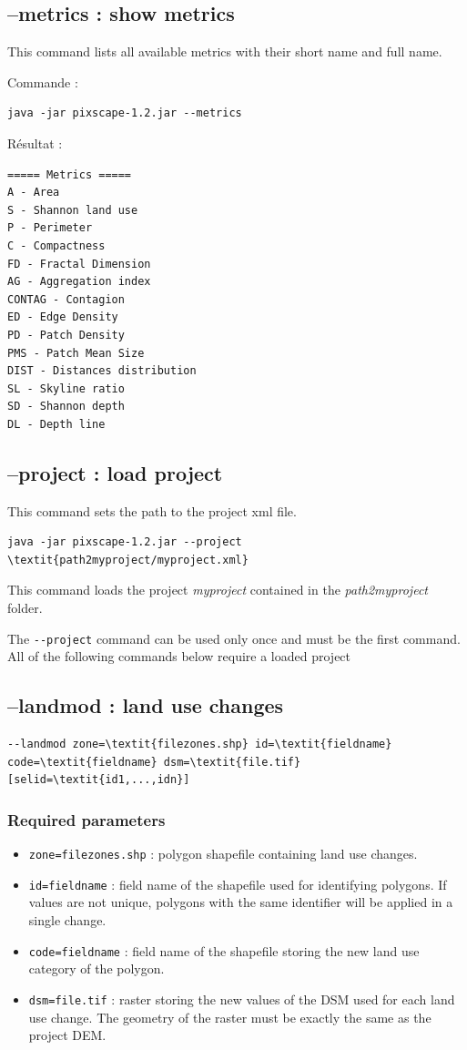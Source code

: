 \documentclass{report}
\begin{document}
\subsection{--metrics : show metrics}
This command lists all available metrics with their short name and full name.

Commande :
\begin{Verbatim}
java -jar pixscape-1.2.jar --metrics
\end{Verbatim}
Résultat :
\begin{Verbatim}
===== Metrics =====
A - Area
S - Shannon land use
P - Perimeter
C - Compactness
FD - Fractal Dimension
AG - Aggregation index
CONTAG - Contagion
ED - Edge Density
PD - Patch Density
PMS - Patch Mean Size
DIST - Distances distribution
SL - Skyline ratio
SD - Shannon depth
DL - Depth line
\end{Verbatim}

\subsection{--project : load project}
This command sets the path to the project xml file.
\begin{Verbatim}[commandchars=\\\{\}]
java -jar pixscape-1.2.jar --project \textit{path2myproject/myproject.xml}
\end{Verbatim}
This command loads the project \textit{myproject} contained in the \textit{path2myproject} folder.

The \verb|--project| command can be used only once and must be the first command.  All of the following commands below require a loaded project

\subsection{--landmod : land use changes}

\begin{Verbatim}[commandchars=\\\{\}]
--landmod zone=\textit{filezones.shp} id=\textit{fieldname} code=\textit{fieldname} dsm=\textit{file.tif} [selid=\textit{id1,...,idn}]
\end{Verbatim}

\subsubsection{Required parameters}
\begin{itemize}
	\item \verb|zone=filezones.shp| : polygon shapefile containing land use changes.
	\item \verb|id=fieldname| : field name of the shapefile used for identifying polygons. If values are not unique, polygons with the same identifier will be applied in a single change.
	\item \verb|code=fieldname| : field name of the shapefile storing the new land use category of the polygon.
	\item \verb|dsm=file.tif| : raster storing the new values of the DSM used for each land use change. The geometry of the raster must be exactly the same as the project DEM.
\end{itemize}
\end{document}
